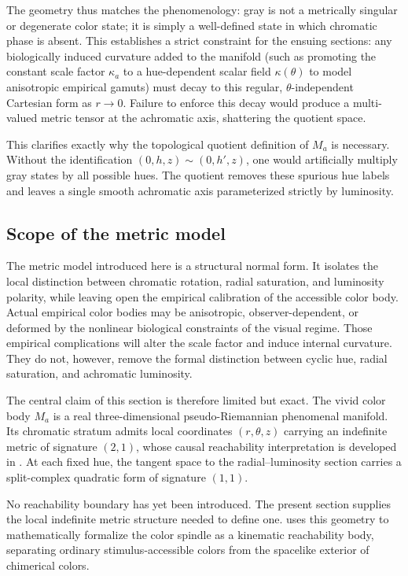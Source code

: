 \documentclass[preprint,12pt,authoryear]{elsarticle}
\theoremstyle{plain}
\theoremstyle{definition}
\theoremstyle{remark}
\begin{document}
The geometry thus matches the phenomenology: gray is not a metrically singular or degenerate color state; it is simply a well-defined state in which chromatic phase is absent. This establishes a strict constraint for the ensuing sections: any biologically induced curvature added to the manifold (such as promoting the constant scale factor $\kappa_a$ to a hue-dependent scalar field $\kappa(\theta)$ to model anisotropic empirical gamuts) must decay to this regular, $\theta$-independent Cartesian form as $r\to 0$. Failure to enforce this decay would produce a multi-valued metric tensor at the achromatic axis, shattering the quotient space.

This clarifies exactly why the topological quotient definition of $M_a$ is necessary. Without the identification $(0,h,z)\sim(0,h',z)$, one would artificially multiply gray states by all possible hues. The quotient removes these spurious hue labels and leaves a single smooth achromatic axis parameterized strictly by luminosity.

\subsection{Scope of the metric model}
\label{subsec:metric-model-scope}

\noindent The metric model introduced here is a structural normal form. It isolates the local distinction between chromatic rotation, radial saturation, and luminosity polarity, while leaving open the empirical calibration of the accessible color body. Actual empirical color bodies may be anisotropic, observer-dependent, or deformed by the nonlinear biological constraints of the visual regime. Those empirical complications will alter the scale factor and induce internal curvature. They do not, however, remove the formal distinction between cyclic hue, radial saturation, and achromatic luminosity.

The central claim of this section is therefore limited but exact. The vivid color body $M_a$ is a real three-dimensional pseudo-Riemannian phenomenal manifold. Its chromatic stratum admits local coordinates $(r,\theta,z)$ carrying an indefinite metric of signature $(2,1)$, whose causal reachability interpretation is developed in . At each fixed hue, the tangent space to the radial--luminosity section carries a split-complex quadratic form of signature $(1,1)$.

No reachability boundary has yet been introduced. The present section supplies the local indefinite metric structure needed to define one.  uses this geometry to mathematically formalize the color spindle as a kinematic reachability body, separating ordinary stimulus-accessible colors from the spacelike exterior of chimerical colors.
\end{document}
